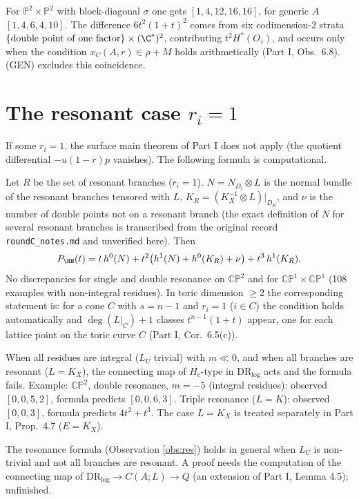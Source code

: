\begin{obs}\label{obs:gen}
For $\mathbb{P}^2\times\mathbb{P}^2$ with block-diagonal $\sigma$ one gets $[1,4,12,16,16]$, for generic $A$ $[1,4,6,4,10]$. The difference $6t^2(1+t)^2$ comes from six codimension-2 strata $\{\text{double point of one factor}\}\times(\C^*)^2$, contributing $t^2H^*(O_\tau)$, and occurs only when the condition $x_C(A,r)\in\rho+M$ holds arithmetically (Part I, Obs.\ 6.8). (GEN) excludes this coincidence.
\end{obs}

\section{The resonant case $r_i=1$}\label{sec:res}
If some $r_i=1$, the surface main theorem of Part I does not apply (the quotient differential $-u(1-r)p$ vanishes). The following formula is computational.

\begin{obs}\label{obs:res}
Let $R$ be the set of resonant branches ($r_i=1$). $N=N_{D_i}\otimes L$ is the normal bundle of the resonant branches tensored with $L$, $K_R=(K_X^{-1}\otimes L)|_{D_R}$, and $\nu$ is the number of double points not on a resonant branch (the exact definition of $N$ for several resonant branches is transcribed from the original record \texttt{roundC\_notes.md} and unverified here\tQ). Then
\[P_{\HH}(t)=t\,h^0(N)+t^2\bigl(h^1(N)+h^0(K_R)+\nu\bigr)+t^3\,h^1(K_R).\]
No discrepancies for single and double resonance on $\mathbb{CP}^2$ and for $\mathbb{CP}^1\times\mathbb{CP}^1$ (108 examples with non-integral residues). In toric dimension $\ge2$ the corresponding statement is: for a cone $C$ with $s=n-1$ and $r_i=1$ ($i\in C$) the condition holds automatically and $\deg(L|_C)+1$ classes $t^{n-1}(1+t)$ appear, one for each lattice point on the toric curve $C$ (Part I, Cor.\ 6.5(c)).
\end{obs}
\begin{obs}
When all residues are integral ($L_U$ trivial) with $m\ll0$, and when all branches are resonant ($L=K_X$), the connecting map of $H_c$-type in $\mathrm{DR}_{\log}$ acts and the formula fails. Example: $\mathbb{CP}^2$, double resonance, $m=-5$ (integral residues): observed $[0,0,5,2]$, formula predicts $[0,0,6,3]$. Triple resonance ($L=K$): observed $[0,0,3]$, formula predicts $4t^2+t^3$. The case $L=K_X$ is treated separately in Part I, Prop.\ 4.7 ($E=K_X$).
\end{obs}
\begin{conj}\tK
The resonance formula (Observation \ref{obs:res}) holds in general when $L_U$ is non-trivial and not all branches are resonant. A proof needs the computation of the connecting map of $\mathrm{DR}_{\log}\to C(A;L)\to Q$ (an extension of Part I, Lemma 4.5); unfinished.
\end{conj}

